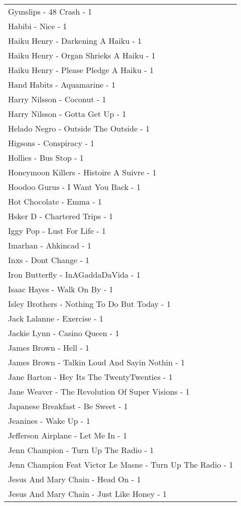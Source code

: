 \documentclass[
]{article}
\begin{document}
\begin{longtable}{l}
Gymslips - 48 Crash - 1 \\ 
Habibi - Nice - 1 \\ 
Haiku Henry - Darkening A Haiku - 1 \\ 
Haiku Henry - Organ Shrieks A Haiku - 1 \\ 
Haiku Henry - Please Pledge A Haiku - 1 \\ 
Hand Habits - Aquamarine - 1 \\ 
Harry Nilsson - Coconut - 1 \\ 
Harry Nilsson - Gotta Get Up - 1 \\ 
Helado Negro - Outside The Outside - 1 \\ 
Higsons - Conspiracy - 1 \\ 
Hollies - Bus Stop - 1 \\ 
Honeymoon Killers - Histoire A Suivre - 1 \\ 
Hoodoo Gurus - I Want You Back - 1 \\ 
Hot Chocolate - Emma - 1 \\ 
Hsker D - Chartered Trips - 1 \\ 
Iggy Pop - Lust For Life - 1 \\ 
Imarhan - Ahkincad - 1 \\ 
Inxs - Dont Change - 1 \\ 
Iron Butterfly - InAGaddaDaVida - 1 \\ 
Isaac Hayes - Walk On By - 1 \\ 
Isley Brothers - Nothing To Do But Today - 1 \\ 
Jack Lalanne - Exercise - 1 \\ 
Jackie Lynn - Casino Queen - 1 \\ 
James Brown - Hell - 1 \\ 
James Brown - Talkin Loud And Sayin Nothin - 1 \\ 
Jane Barton - Hey Its The TwentyTwenties - 1 \\ 
Jane Weaver - The Revolution Of Super Visions - 1 \\ 
Japanese Breakfast - Be Sweet - 1 \\ 
Jeanines - Wake Up - 1 \\ 
Jefferson Airplane - Let Me In - 1 \\ 
Jenn Champion - Turn Up The Radio - 1 \\ 
Jenn Champion Feat Victor Le Masne - Turn Up The Radio - 1 \\ 
Jesus And Mary Chain - Head On - 1 \\ 
Jesus And Mary Chain - Just Like Honey - 1 \\ 

\end{longtable}
\end{document}
